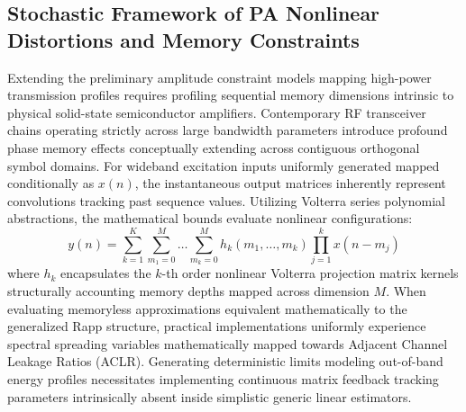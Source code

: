\documentclass[a4paper,14pt]{extreport}
\begin{document}
\subsection{Stochastic Framework of PA Nonlinear Distortions and Memory Constraints}
Extending the preliminary amplitude constraint models mapping high-power transmission profiles requires profiling sequential memory dimensions intrinsic to physical solid-state semiconductor amplifiers. Contemporary RF transceiver chains operating strictly across large bandwidth parameters introduce profound phase memory effects conceptually extending across contiguous orthogonal symbol domains. For wideband excitation inputs uniformly generated mapped conditionally as $x(n)$, the instantaneous output matrices inherently represent convolutions tracking past sequence values. Utilizing Volterra series polynomial abstractions, the mathematical bounds evaluate nonlinear configurations:
\begin{equation}
    y(n) = \sum_{k=1}^{K} \sum_{m_1=0}^{M} \dots \sum_{m_k=0}^{M} h_k(m_1, \dots, m_k) \prod_{j=1}^{k} x(n-m_j)
\end{equation}
where $h_k$ encapsulates the $k$-th order nonlinear Volterra projection matrix kernels structurally accounting memory depths mapped across dimension $M$. When evaluating memoryless approximations equivalent mathematically to the generalized Rapp structure, practical implementations uniformly experience spectral spreading variables mathematically mapped towards Adjacent Channel Leakage Ratios (ACLR). Generating deterministic limits modeling out-of-band energy profiles necessitates implementing continuous matrix feedback tracking parameters intrinsically absent inside simplistic generic linear estimators.
\end{document}
